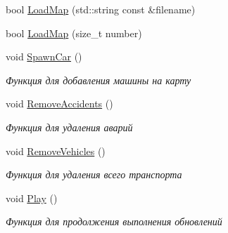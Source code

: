 \begin{DoxyCompactItemize}
\item 
bool \hyperlink{classrtm_1_1_world_controller_a66ec47d83ef2aa4bc88ef8dd91072491}{Load\+Map} (std\+::string const \&filename)
\item 
bool \hyperlink{classrtm_1_1_world_controller_ada6f03eb6808d52ed7fc6af239851ff3}{Load\+Map} (size\+\_\+t number)
\item 
\mbox{\label{classrtm_1_1_world_controller_ae9fbdfd9f1b5a9dafe74c0eb1b3919bc}} 
void \hyperlink{classrtm_1_1_world_controller_ae9fbdfd9f1b5a9dafe74c0eb1b3919bc}{Spawn\+Car} ()
\begin{DoxyCompactList}\small\item\em Функция для добавления машины на карту \end{DoxyCompactList}\item 
\mbox{\label{classrtm_1_1_world_controller_a8d3e8c8133111ad23a9f8c23fb31c6d2}} 
void \hyperlink{classrtm_1_1_world_controller_a8d3e8c8133111ad23a9f8c23fb31c6d2}{Remove\+Accidents} ()
\begin{DoxyCompactList}\small\item\em Функция для удаления аварий \end{DoxyCompactList}\item 
\mbox{\label{classrtm_1_1_world_controller_a31576a18588c9f736298f96ceefd48d4}} 
void \hyperlink{classrtm_1_1_world_controller_a31576a18588c9f736298f96ceefd48d4}{Remove\+Vehicles} ()
\begin{DoxyCompactList}\small\item\em Функция для удаления всего транспорта \end{DoxyCompactList}\item 
\mbox{\label{classrtm_1_1_world_controller_a36cb8912de7839fbc337a81f24bac1c7}} 
void \hyperlink{classrtm_1_1_world_controller_a36cb8912de7839fbc337a81f24bac1c7}{Play} ()
\begin{DoxyCompactList}\small\item\em Функция для продолжения выполнения обновлений \end{DoxyCompactList}\item 
\mbox{\label{classrtm_1_1_world_controller_a69bc1f11010c2ec18ed5afcde9ea2346}} 

\end{DoxyCompactItemize}
